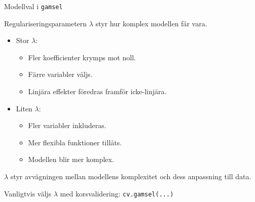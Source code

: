 \documentclass[10pt,english]{beamer}
\begin{document}
\begin{frame}{Modellval i \texttt{gamsel}}

    

    Regulariseringsparametern \(\lambda\) styr hur komplex modellen får vara.

    \begin{itemize}
        \item Stor \(\lambda\):
        \begin{itemize}
            \item Fler koefficienter krymps mot noll.
            \item Färre variabler väljs.
            \item Linjära effekter föredras framför icke-linjära.
        \end{itemize}

        \item Liten \(\lambda\):
        \begin{itemize}
            \item Fler variabler inkluderas.
            \item Mer flexibla funktioner tillåts.
            \item Modellen blir mer komplex.
        \end{itemize}
    \end{itemize}

    \begin{greenbox}
        \(\lambda\) styr avvägningen mellan
        modellens komplexitet och dess anpassning till data.
    \end{greenbox}

    \medskip

    Vanligtvis väljs \(\lambda\) med korsvalidering: \texttt{cv.gamsel(...)}
 

\end{frame}
\end{document}
